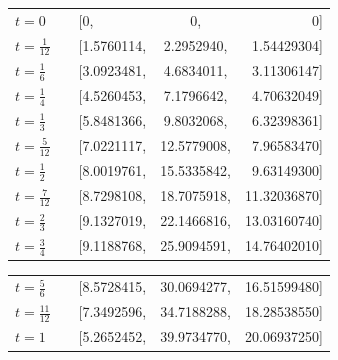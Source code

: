 \begin{tabular}{lclcr}


$t=     0$&&[0,&0,&0]\\


$t=\frac{1}{12}$&&[1.5760114,&2.2952940,&1.54429304]\\


$t=\frac{1}{6}$&&[3.0923481,&4.6834011,&3.11306147]\\


$t=\frac{1}{4}$&&[4.5260453,&7.1796642,&4.70632049]\\


$t=\frac{1}{3}$&&[5.8481366,&9.8032068,&6.32398361]\\


$t=\frac{5}{12}$&&[7.0221117,&12.5779008,&7.96583470]\\


$t=\frac{1}{2}$&&[8.0019761,&15.5335842,&9.63149300]\\


$t=\frac{7}{12}$&&[8.7298108,&18.7075918,&11.32036870]\\


$t=\frac{2}{3}$&&[9.1327019,&22.1466816,&13.03160740]\\


$t=\frac{3}{4}$&&[9.1188768,&25.9094591,&14.76402010]


\end{tabular}





\begin{tabular}{lclcr}


$t=\frac{5}{6}$&&[8.5728415,&30.0694277,&16.51599480]\\


$t=\frac{11}{12}$&&[7.3492596,&34.7188288,&18.28538550]\\


$t= 1      $&&[5.2652452,&39.9734770,&20.06937250]\\


\end{tabular}


\vspace{0.5cm}





















